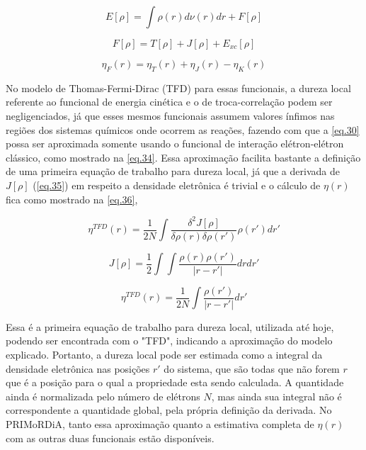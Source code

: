 \documentclass[a4paper,11pt]{refart}
\begin{document}
\begin{equation}
E[\rho] =  \int \rho(r) d \nu (r) dr + F[\rho]
\label{eq.31}
\end{equation}

\begin{equation}
F[\rho] = T[\rho] + J[\rho] + E_{xc}[\rho]
\label{eq.32}
\end{equation}

\begin{equation}
\eta_{F} (r) = \eta_{T}(r)+ \eta_{J}(r) - \eta_{K}(r)
\label{eq.33}
\end{equation}

No modelo de Thomas-Fermi-Dirac (TFD) para essas funcionais, a dureza local referente ao funcional de energia cinética e o de troca-correlação podem ser negligenciados, já que esses mesmos funcionais assumem valores ínfimos nas regiões dos sistemas químicos onde ocorrem as reações, fazendo com que a \autoref{eq.30} possa ser aproximada somente usando o funcional de interação elétron-elétron clássico, como mostrado na \autoref{eq.34}. Essa aproximação facilita bastante a definição de uma primeira equação de trabalho para dureza local, já que a derivada de $J[\rho]$ (\autoref{eq.35}) em respeito a densidade eletrônica é trivial e o cálculo de $\eta(r)$ fica como mostrado na \autoref{eq.36}, 

\begin{equation}
\eta^{TFD} (r) = \frac{1}{2N} \int \frac{\delta^2 J[\rho]}{\delta \rho(r) \delta \rho(r')} \rho(r')dr'
\label{eq.34} 
\end{equation}

\begin{equation}
J[\rho] = \frac{1}{2} \int \int \frac{\rho(r) \rho(r')}{|r-r'|} dr dr'
\label{eq.35}
\end{equation}

\begin{equation}
\eta^{TFD} (r) =  \frac{1}{2N} \int \frac{\rho(r')}{|r-r'|}  dr'
\label{eq.36} 
\end{equation}

Essa é a primeira equação de trabalho para dureza local, utilizada até hoje, podendo ser encontrada com o "TFD", indicando a aproximação do modelo explicado. Portanto, a dureza local pode ser estimada como a integral da densidade eletrônica nas posições $r'$ do sistema, que são todas que não forem $r$ que é a posição para o qual a propriedade esta sendo calculada. A quantidade ainda é normalizada pelo número de elétrons $N$, mas ainda sua integral não é correspondente a quantidade global, pela própria definição da derivada. No PRIMoRDiA, tanto essa aproximação quanto a estimativa completa de $\eta(r)$ com as outras duas funcionais estão disponíveis.   
\end{document}
